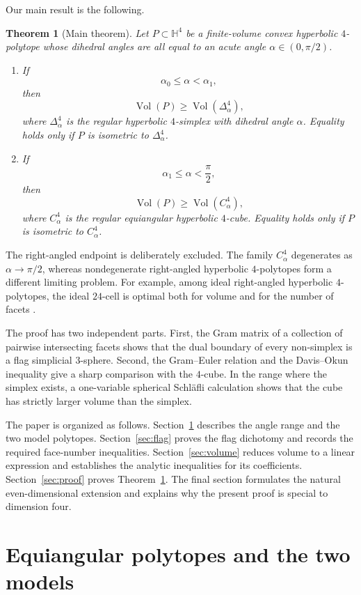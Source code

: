 \documentclass[12pt,a4paper]{article}
\theoremstyle{thmstyleone}
\newtheorem{theorem}{Theorem}[section]
\theoremstyle{thmstylethree}
\theoremstyle{thmstyletwo}
\newcommand{\HH}{\mathbb H}
\newcommand{\Vol}{\operatorname{Vol}}
\begin{document}
Our main result is the following.

\begin{theorem}[Main theorem]\label{thm:main}
Let $P\subset\HH^4$ be a finite-volume convex hyperbolic $4$-polytope whose
dihedral angles are all equal to an acute angle
$\alpha\in(0,\pi/2)$.
\begin{enumerate}
\item If
\[
 \alpha_0\leq\alpha<\alpha_1,
\]
then
\[
 \Vol(P)\geq\Vol(\Delta^4_\alpha),
\]
where $\Delta^4_\alpha$ is the regular hyperbolic $4$-simplex with dihedral
angle $\alpha$.  Equality holds only if $P$ is isometric to
$\Delta^4_\alpha$.
\item If
\[
 \alpha_1\leq\alpha<\frac{\pi}{2},
\]
then
\[
 \Vol(P)\geq\Vol(C^4_\alpha),
\]
where $C^4_\alpha$ is the regular equiangular hyperbolic $4$-cube.  Equality
holds only if $P$ is isometric to $C^4_\alpha$.
\end{enumerate}
\end{theorem}

The right-angled endpoint is deliberately excluded.  The family
$C^4_\alpha$ degenerates as $\alpha\to\pi/2$, whereas nondegenerate
right-angled hyperbolic $4$-polytopes form a different limiting problem.  For
example, among ideal right-angled hyperbolic $4$-polytopes, the ideal
$24$-cell is optimal both for volume and for the number of facets
\cite{Kolpakov2012}.

The proof has two independent parts.  First, the Gram matrix of a collection
of pairwise intersecting facets shows that the dual boundary of every
non-simplex is a flag simplicial $3$-sphere.  Second, the Gram--Euler relation
and the Davis--Okun inequality give a sharp comparison with the $4$-cube.
In the range where the simplex exists, a one-variable spherical
Schl\"afli calculation shows that the cube has strictly larger volume than
the simplex.

The paper is organized as follows.  Section~\ref{sec:geometry} describes the
angle range and the two model polytopes.  Section~\ref{sec:flag} proves the
flag dichotomy and records the required face-number inequalities.
Section~\ref{sec:volume} reduces volume to a linear expression and establishes
the analytic inequalities for its coefficients.  Section~\ref{sec:proof}
proves Theorem~\ref{thm:main}.  The final section formulates the natural
even-dimensional extension and explains why the present proof is special to
dimension four.

\section{Equiangular polytopes and the two models}\label{sec:geometry}
\end{document}
